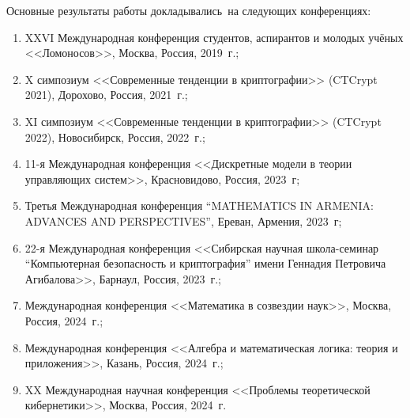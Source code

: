 {\probation}
Основные результаты работы докладывались~на следующих конференциях:
\begin{enumerate}
    \item XXVI Международная конференция студентов, аспирантов и молодых учёных <<Ломоносов>>, Москва, Россия, 2019~г.;

    \item X симпозиум <<Современные тенденции в криптографии>> (CTCrypt 2021), Дорохово, Россия, 2021~г.;

    \item XI симпозиум <<Современные тенденции в криптографии>> (CTCrypt 2022), Новосибирск, Россия, 2022~г.;


    \item 11-я Международная конференция <<Дискретные модели в теории управляющих систем>>, Красновидово, Россия, 2023~г;

    \item Третья Международная конференция ``MATHEMATICS IN ARMENIA: ADVANCES AND PERSPECTIVES'', Ереван, Армения, 2023~г;

    \item 22-я Международная конференция <<Сибирская научная школа-семинар ``Компьютерная безопасность и криптография'' имени Геннадия Петровича Агибалова>>, Барнаул, Россия, 2023~г.;

    \item Международная конференция <<Математика в созвездии наук>>, Москва, Россия, 2024~г.;

    \item Международная конференция <<Алгебра и математическая логика: теория и приложения>>, Казань, Россия, 2024~г.;

    \item XX Международная научная конференция <<Проблемы теоретической кибернетики>>, Москва, Россия, 2024~г.
\end{enumerate}

